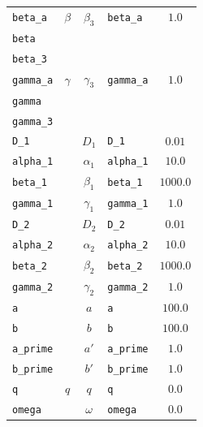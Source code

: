 \documentclass{amsproc}
\theoremstyle{definition}
\theoremstyle{remark}
\numberwithin{equation}{section}
\numberwithin{figure}{section}
\begin{document}
\begin{table}[ht]
\begin{tabular}{|l||c|c|l|c|}
\texttt{beta\_a}  & $\beta$   & $\beta_3$  & \texttt{beta\_a}    & $1.0$         \\
\texttt{beta}     &           &            &                     &               \\
\texttt{beta\_3}  &           &            &                     &               \\ \hline
\texttt{gamma\_a} & $\gamma$  & $\gamma_3$ & \texttt{gamma\_a}   & $1.0$         \\
\texttt{gamma}    &           &            &                     &               \\
\texttt{gamma\_3} &           &            &                     &               \\ \hline
\texttt{D\_1}     &           & $D_1$      & \texttt{D\_1}       & $0.01$        \\ \hline
\texttt{alpha\_1} &           & $\alpha_1$ & \texttt{alpha\_1}   & $10.0$        \\ \hline
\texttt{beta\_1}  &           & $\beta_1$  & \texttt{beta\_1}    & $1000.0$      \\ \hline
\texttt{gamma\_1} &           & $\gamma_1$ & \texttt{gamma\_1}   & $1.0$         \\ \hline
\texttt{D\_2}     &           & $D_2$      & \texttt{D\_2}       & $0.01$        \\ \hline
\texttt{alpha\_2} &           & $\alpha_2$ & \texttt{alpha\_2}   & $10.0$        \\ \hline
\texttt{beta\_2}  &           & $\beta_2$  & \texttt{beta\_2}    & $1000.0$      \\ \hline
\texttt{gamma\_2} &           & $\gamma_2$ & \texttt{gamma\_2}   & $1.0$         \\ \hline
\texttt{a}        &           & $a$        & \texttt{a}          & $100.0$       \\ \hline
\texttt{b}        &           & $b$        & \texttt{b}          & $100.0$       \\ \hline
\texttt{a\_prime} &           & $a'$       & \texttt{a\_prime}   & $1.0$         \\ \hline
\texttt{b\_prime} &           & $b'$       & \texttt{b\_prime}   & $1.0$         \\ \hline
\texttt{q}        & $q$       & $q$        & \texttt{q}          & $0.0$         \\ \hline
\texttt{omega}    &           & $\omega$   & \texttt{omega}      & $0.0$         \\ \hline
\end{tabular}
\setlength{\tabcolsep}{1pt}
\end{table}
\end{document}
